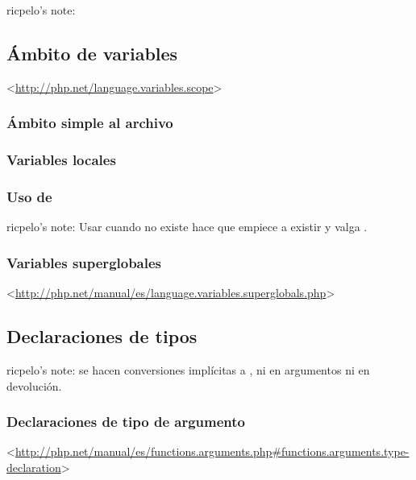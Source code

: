 \documentclass[a4paper,11pt,spanish]{sphinxmanual}
\begin{document}
ricpelo's note:


\subsection{Ámbito de variables}
\label{\detokenize{php:ambito-de-variables}}
\textless{}\url{http://php.net/language.variables.scope}\textgreater{}


\subsubsection{Ámbito simple al archivo}
\label{\detokenize{php:ambito-simple-al-archivo}}

\subsubsection{Variables locales}
\label{\detokenize{php:variables-locales}}

\subsubsection{Uso de }
\label{\detokenize{php:uso-de-global}}
ricpelo's note: Usar  cuando  no existe hace que
 empiece a existir y valga .


\subsubsection{Variables superglobales}
\label{\detokenize{php:variables-superglobales}}
\textless{}\url{http://php.net/manual/es/language.variables.superglobals.php}\textgreater{}


\subsection{Declaraciones de tipos}
\label{\detokenize{php:declaraciones-de-tipos}}
ricpelo's note:  se hacen conversiones implícitas a , ni
en argumentos ni en devolución.


\subsubsection{Declaraciones de tipo de argumento}
\label{\detokenize{php:declaraciones-de-tipo-de-argumento}}
\textless{}\url{http://php.net/manual/es/functions.arguments.php\#functions.arguments.type-declaration}\textgreater{}
\end{document}
